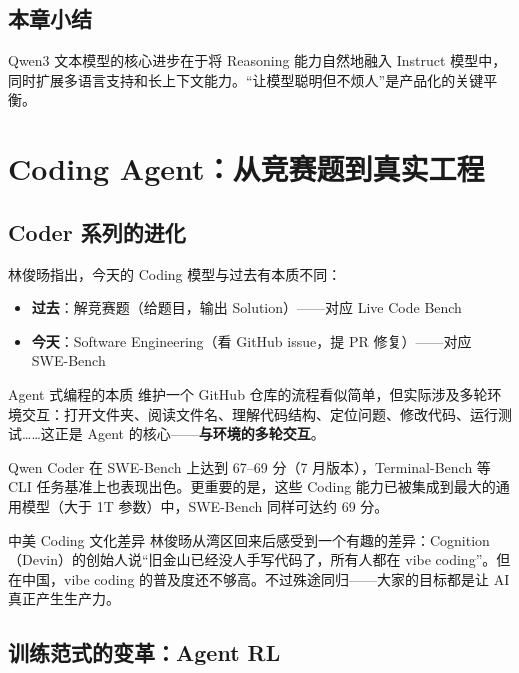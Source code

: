 \documentclass[a4paper]{article}
\begin{document}
\subsection{本章小结}

Qwen3 文本模型的核心进步在于将 Reasoning 能力自然地融入 Instruct 模型中，同时扩展多语言支持和长上下文能力。``让模型聪明但不烦人''是产品化的关键平衡。

\section{Coding Agent：从竞赛题到真实工程}

\subsection{Coder 系列的进化}

林俊旸指出，今天的 Coding 模型与过去有本质不同：

\begin{itemize}
    \item \textbf{过去}：解竞赛题（给题目，输出 Solution）——对应 Live Code Bench
    \item \textbf{今天}：Software Engineering（看 GitHub issue，提 PR 修复）——对应 SWE-Bench
\end{itemize}

\begin{importantbox}{Agent 式编程的本质}
维护一个 GitHub 仓库的流程看似简单，但实际涉及多轮环境交互：打开文件夹、阅读文件名、理解代码结构、定位问题、修改代码、运行测试……这正是 Agent 的核心——\textbf{与环境的多轮交互}。
\end{importantbox}

Qwen Coder 在 SWE-Bench 上达到 67--69 分（7 月版本），Terminal-Bench 等 CLI 任务基准上也表现出色。更重要的是，这些 Coding 能力已被集成到最大的通用模型（大于 1T 参数）中，SWE-Bench 同样可达约 69 分。

\begin{knowledgebox}{中美 Coding 文化差异}
林俊旸从湾区回来后感受到一个有趣的差异：Cognition（Devin）的创始人说``旧金山已经没人手写代码了，所有人都在 vibe coding''。但在中国，vibe coding 的普及度还不够高。不过殊途同归——大家的目标都是让 AI 真正产生生产力。
\end{knowledgebox}

\subsection{训练范式的变革：Agent RL}
\end{document}
